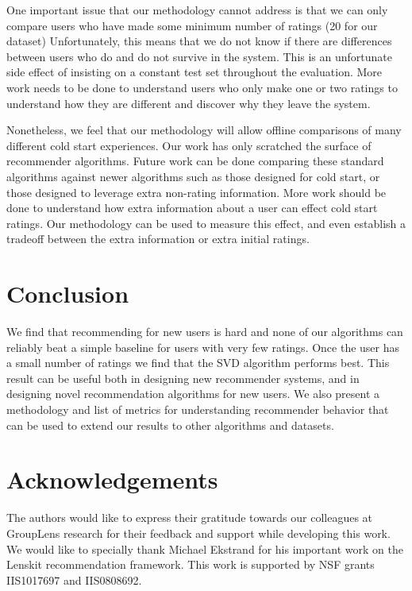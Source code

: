 \documentclass[letterpaper]{sig-alternate}
\begin{document}
  One important issue that our methodology cannot address is that we can only compare users who have made some minimum number of ratings (20 for our dataset)
  Unfortunately, this means that we do not know if there are differences between users who do and do not survive in the system.
  This is an unfortunate side effect of insisting on a constant test set throughout the evaluation.
  More work needs to be done to understand users who only make one or two ratings to understand how they are different and discover why they leave the system.

  Nonetheless, we feel that our methodology will allow offline comparisons of many different cold start experiences.
  Our work has only scratched the surface of recommender algorithms.
  Future work can be done comparing these standard algorithms against newer algorithms such as those designed for cold start, or those designed to leverage extra non-rating information.
  More work should be done to understand how extra information about a user can effect cold start ratings.
  Our methodology can be used to measure this effect, and even establish a tradeoff between the extra information or extra initial ratings.



\section{Conclusion}
  We find that recommending for new users is hard and none of our algorithms can reliably beat a simple baseline for users with very few ratings.
  Once the user has a small number of ratings we find that the SVD algorithm performs best.
  This result can be useful both in designing new recommender systems, and in designing novel recommendation algorithms for new users.
  We also present a methodology and list of metrics for understanding recommender behavior that can be used to extend our results to other algorithms and datasets.

\section{Acknowledgements}
  
  The authors would like to express their gratitude towards our colleagues at GroupLens research for their feedback and support while developing this work.
  We would like to specially thank Michael Ekstrand for his  important work on the Lenskit recommendation framework.
  This work is supported by NSF grants IIS1017697 and IIS0808692.


\end{document}
